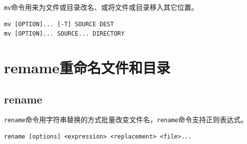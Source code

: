 \documentclass[12pt, openany, oneside]{book}
\begin{document}
\lstinline|mv|命令用来为文件或目录改名、或将文件或目录移入其它位置。

\vspace{-0.5cm}
\begin{lstlisting}
mv [OPTION]... [-T] SOURCE DEST
mv [OPTION]... SOURCE... DIRECTORY
\end{lstlisting}

\begin{table}[H]
    \centering
    \caption{\lstinline|mv|参数说明}
\end{table}

\newpage

\section{remame重命名文件和目录}

\subsection{rename}

\lstinline|rename|命令用字符串替换的方式批量改变文件名，\lstinline|rename|命令支持正则表达式。

\vspace{-0.5cm}
\begin{lstlisting}
rename [options] <expression> <replacement> <file>...
\end{lstlisting}
\end{document}

